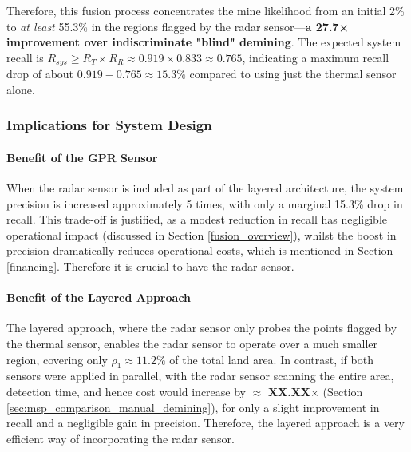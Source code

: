         Therefore, this fusion process concentrates the mine likelihood from an initial 2\% to \textit{at least} 55.3\% in the regions flagged by the radar sensor—\textbf{a  27.7× improvement over indiscriminate "blind" demining}. The expected system recall is $R_{sys} \geq R_T \times R_R \approx 0.919 \times 0.833 \approx 0.765$, indicating a maximum recall drop of about $0.919 - 0.765 \approx 15.3\%$ compared to using just the thermal sensor alone.


    \subsubsection{Implications for System Design}

        \paragraph{Benefit of the GPR Sensor}
        
            
            When the radar sensor is included as part of the layered architecture, the system precision is increased approximately 5 times, with only a marginal 15.3\% drop in recall. This trade-off is justified, as a modest reduction in recall has negligible operational impact (discussed in Section \ref{fusion_overview}), whilst the boost in precision dramatically reduces operational costs, which is mentioned in Section \ref{financing}. Therefore it is crucial to have the radar sensor.
                
        \paragraph{Benefit of the Layered Approach} \label{Benefit of the Layered Approach}
        
            The layered approach, where the radar sensor only probes the points flagged by the thermal sensor, enables the radar sensor to operate over a much smaller region, covering only $\rho_1 \approx 11.2\%$ of the total land area. In contrast, if both sensors were applied in parallel, with the radar sensor scanning the entire area, detection time, and hence cost would increase by $\approx$ \textbf{XX.XX}$\times$ (Section \ref{sec:msp_comparison_manual_demining}), for only a slight improvement in recall and a negligible gain in precision. Therefore, the layered approach is a very efficient way of incorporating the radar sensor. 

            

        